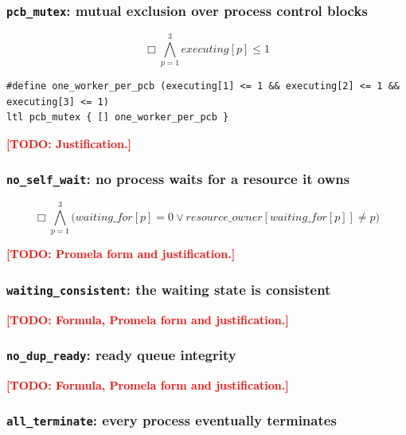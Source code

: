 \documentclass[11pt,a4paper]{article}
\newcommand{\always}{\ensuremath{\Box}}
\newcommand{\code}[1]{\texttt{#1}}
\newcommand{\todo}[1]{\textcolor{red}{\textbf{[TODO: #1]}}}
\begin{document}
\subsubsection*{\code{pcb\_mutex}: mutual exclusion over process control blocks}

\[ \always \bigwedge_{p=1}^{3} \mathit{executing}[p] \le 1 \]

\begin{lstlisting}[style=promela]
#define one_worker_per_pcb (executing[1] <= 1 && executing[2] <= 1 && executing[3] <= 1)
ltl pcb_mutex { [] one_worker_per_pcb }
\end{lstlisting}

\todo{Justification.}

\subsubsection*{\code{no\_self\_wait}: no process waits for a resource it owns}

\[ \always \bigwedge_{p=1}^{3}
   \bigl( \mathit{waiting\_for}[p] = 0 \lor
          \mathit{resource\_owner}[\mathit{waiting\_for}[p]] \neq p \bigr) \]

\todo{Promela form and justification.}

\subsubsection*{\code{waiting\_consistent}: the waiting state is consistent}

\todo{Formula, Promela form and justification.}

\subsubsection*{\code{no\_dup\_ready}: ready queue integrity}

\todo{Formula, Promela form and justification.}

\subsubsection*{\code{all\_terminate}: every process eventually terminates}
\end{document}
